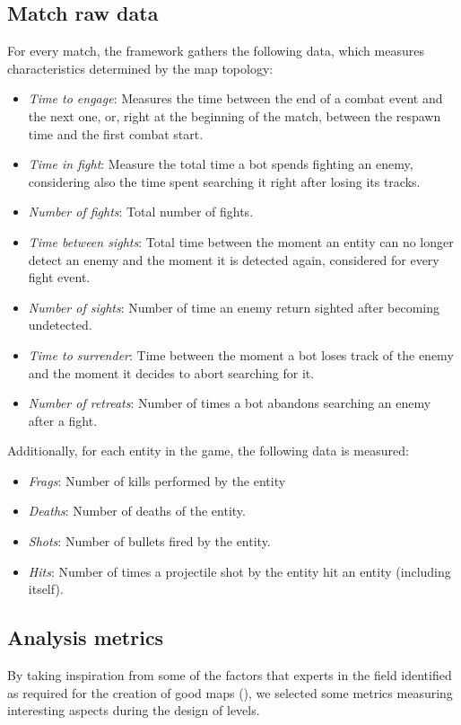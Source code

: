 \subsection{Match raw data}

For every match, the framework gathers the following data, which measures characteristics determined by the map topology:

\begin{itemize}
\item \textit{Time to engage}: Measures the time between the end of a combat event and the next one, or, right at the beginning of the match, between the respawn time and the first combat start.
\item \textit{Time in fight}: Measure the total time a bot spends fighting an enemy, considering also the time spent searching it right after losing its tracks.
\item \textit{Number of fights}: Total number of fights.
\item \textit{Time between sights}: Total time between the moment an entity can no longer detect an enemy and the moment it is detected again, considered for every fight event.
\item \textit{Number of sights}: Number of time an enemy return sighted after becoming undetected.
\item \textit{Time to surrender}: Time between the moment a bot loses track of the enemy and the moment it decides to abort searching for it.
\item \textit{Number of retreats}: Number of times a bot abandons searching an enemy after a fight.
\end{itemize}

Additionally, for each entity in the game, the following data is measured:

\begin{itemize}
\item \textit{Frags}: Number of kills performed by the entity
\item \textit{Deaths}: Number of deaths of the entity.
\item \textit{Shots}: Number of bullets fired by the entity.
\item \textit{Hits}: Number of times a projectile shot by the entity hit an entity (including itself).
\end{itemize}

\subsection{Analysis metrics}
By taking inspiration from some of the factors that experts in the field identified as required for the creation of good maps (\cite{game_design_secret_sages, best_multiplayer_maps_one, best_multiplayer_maps_two}), we selected some metrics measuring interesting aspects during the design of levels.

